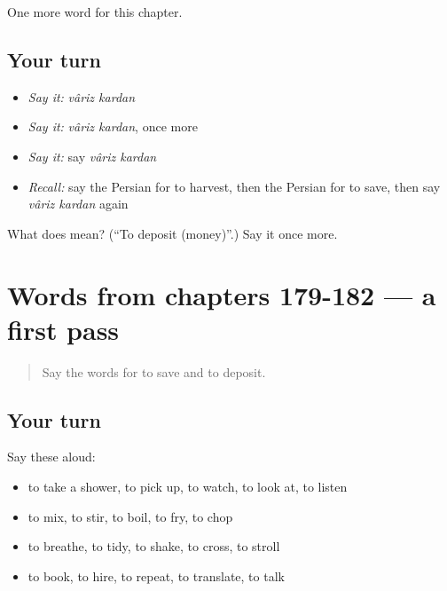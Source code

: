 \begin{grammarlens}[title={What you've built}]
One more word for this chapter.
\end{grammarlens}

\subsection*{Your turn}
\begin{itemize}
\raggedright
  \item \emph{Say it:} \emph{vâriz kardan}
  \item \emph{Say it:} \emph{vâriz kardan}, once more
  \item \emph{Say it:} say \emph{vâriz kardan}
  \item \emph{Recall:} say the Persian for to harvest, then the Persian for to save, then say \emph{vâriz kardan} again
\end{itemize}

\begin{tcolorbox}[breakable,colback=teal!4,colframe=teal!35!black,title={Before you move on}]
What does   mean? (\textquotedblleft{}To deposit (money)\textquotedblright{}.) Say it once more.
\end{tcolorbox}
\section[(dialogue)]{Words from chapters 179-182 — a first pass}

\label{lesson:FA-R187-first-pass-words-from-chapters-179-182}



\begin{quote}
Say the words for to save and to deposit.
\end{quote}

\subsection*{Your turn}
Say these aloud:

\begin{itemize}
\raggedright
  \item to take a shower, to pick up, to watch, to look at, to listen
  \item to mix, to stir, to boil, to fry, to chop
  \item to breathe, to tidy, to shake, to cross, to stroll
  \item to book, to hire, to repeat, to translate, to talk
\end{itemize}

